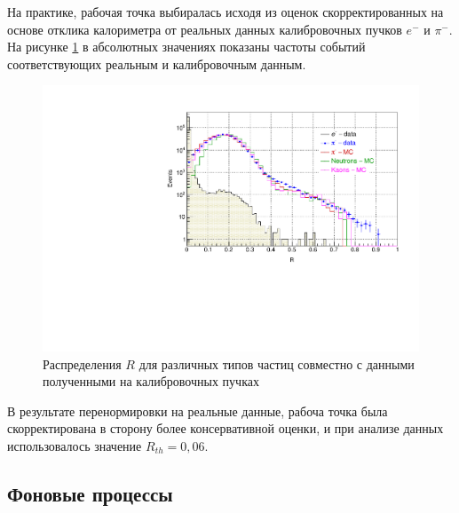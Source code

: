 На практике, рабочая точка выбиралась исходя из оценок скорректированных
на основе отклика калориметра от реальных данных калибровочных пучков
$e^{-}$ и $\pi^{-}$. На рисунке \ref{fig:r-dist-realdata} в абсолютных
значениях показаны частоты событий соответствующих реальным и калибровочным
данным.
\begin{figure}[ht]
    \centering
    \includegraphics[width=.75\textwidth]{images/r-simulations/HCraio-e-428-pi-3924-MC.pdf}
    \caption{Распределения $R$ для различных типов частиц совместно с
    данными полученными на калибровочных пучках}
    \label{fig:r-dist-realdata}
\end{figure}

В результате перенормировки на реальные данные, рабоча точка была
скорректирована в сторону более консервативной оценки, и при анализе
данных использовалось значение $R_{th} = 0{,}06$.

\subsection{Фоновые процессы}

